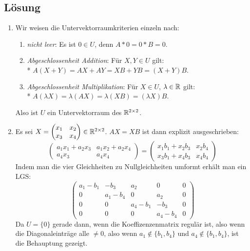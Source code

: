 \subsection{Lösung}
\begin{enumerate}
	\item Wir weisen die Untervektorraumkriterien einzeln nach:
	\begin{enumerate}
	 	\item \emph{nicht leer}: Es ist \( 0 \in U \), denn \( A*0 = 0*B = 0 \).
	 	\item \emph{Abgeschlossenheit Addition}: Für \( X, Y \in U \) gilt: \\* \( A(X+Y) = AX + AY = XB + YB = (X+Y)B \).
	 	\item \emph{Abgeschlossenheit Multiplikation}: Für \( X \in U \), \( \lambda \in \mathbb{R} \) gilt: \\* \( A(\lambda X) = \lambda(AX) = \lambda(XB) = (\lambda X)B \).
	 \end{enumerate} 
	 Also ist \( U \) ein Untervektorraum des \( \mathbb{R}^{2 \times 2} \).

	 \item Es sei \( X = \begin{pmatrix}
	 	x_1 & x_2 \\
	 	x_3 & x_4
	 \end{pmatrix} \in \mathbb{R}^{2 \times 2} \). \( AX = XB \) ist dann explizit ausgeschrieben:
	 \begin{equation*}
	 	\begin{pmatrix}
	 		a_1x_1+a_2x_3 & a_1x_2+a_2x_4 \\
	 		a_4x_3 & a_4x_4 
	 	\end{pmatrix} = \begin{pmatrix}
	 		x_1b_1 + x_2b_3 & x_2b_4 \\
	 		x_3b_1 + x_4b_3 & x_4b_4
	 	\end{pmatrix}
	 \end{equation*}
	 Indem man die vier Gleichheiten zu Nullgleichheiten umformt erhält man ein LGS:
	 \begin{equation*}
	 	\left( \begin{array}{cccc|c}
	 		a_1-b_1 & -b_3 & a_2 & 0 & 0 \\
	 		0 & a_1-b_4 & 0 & a_2 & 0 \\
	 		0 & 0 & a_4-b_1 & -b_3 & 0 \\
	 		0 & 0 & 0 & a_4-b_4 & 0 
	 	\end{array} \right)
	 \end{equation*}
	 Da \( U = \{ 0 \} \) gerade dann, wenn die Koeffizenzenmatrix regulär ist, also wenn die Diagonaleinträge alle \( \neq 0 \), also wenn \( a_1 \not \in \{ b_1, b_4 \} \) und \( a_4 \not \in \{b_1, b_4 \} \), ist die Behauptung gezeigt.
\end{enumerate}

\newpage
